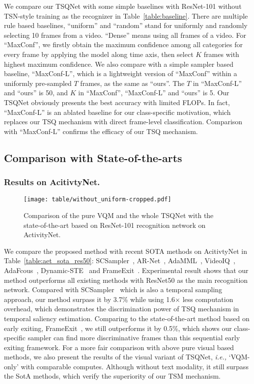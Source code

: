\documentclass[runningheads]{llncs}
\newcommand{\tabref}[1]{Table~\ref{#1}}
\begin{document}
We compare our TSQNet with some simple baselines with ResNet-101 without TSN-style training as the recognizer in \tabref{table:baseline}. There are multiple rule based baselines, ``uniform'' and ``random'' stand for uniformly and randomly selecting 10 frames from a video. ``Dense'' means using all frames of a video. For ``MaxConf'', we firstly obtain the maximum confidence among all categories for every frame by applying the model along time axis, then select $K$ frames with highest maximum confidence. We also compare with a simple sampler based baseline, ``MaxConf-L'', which is a lightweight version of ``MaxConf'' within a uniformly pre-sampled $T$ frames, as the same as ``ours''. The $T$ in ``MaxConf-L'' and ``ours'' is 50, and $K$ in ``MaxConf'', ``MaxConf-L'' and ``ours'' is 5.
 Our TSQNet obviously presents the best accuracy with limited FLOPs. In fact, ``MaxConf-L'' is an ablated baseline for our class-specific motivation, which replaces our TSQ mechanism with direct frame-level classification. Comparison with ``MaxConf-L'' confirms the efficacy of our TSQ mechanism.


\subsection{Comparison with State-of-the-arts}
\label{exp:sota}

\subsubsection{Results on AcitivtyNet.}
\begin{wrapfigure}{r}{0.5\textwidth} \centering \texttt{[image: table/without\_uniform-cropped.pdf]} \caption{Comparison of the pure VQM and the whole TSQNet with the state-of-the-art based on ResNet-101 recognition network on ActivityNet.} \label{Fig.anet_res101} \end{wrapfigure}
We compare the proposed method with recent SOTA methods on AcitivtyNet in \tabref{table:aet_sota_res50}: SCSampler~\cite{scsampler19}, AR-Net~\cite{arnet}, AdaMML~\cite{adamml}, VideoIQ~\cite{videoiq}, AdaFcous~\cite{adafocus}, Dynamic-STE~\cite{dynamicSTE} and FrameExit~\cite{frameexit}.
Experimental result shows that our method 
outperforms all existing methods with ResNet50 as the main recognition network. 
Compared with SCSampler~\cite{scsampler19} which is also a temporal sampling approach, our method surpass it by 3.7\% while using 1.6$\times$ less computation overhead, which demonstrates the discrimination power of TSQ mechanism in temporal saliency estimation.
Comparing to the state-of-the-art method based on early exiting, FrameExit~\cite{frameexit}, we still outperforms it by 0.5\%, which shows our class-specific sampler can find more discriminative frames than this sequential early exiting framework. For a more fair comparison with above pure visual based methods, we also present the results of the visual variant of TSQNet, \emph{i.e.,} `VQM-only' with comparable computes. Although without text modality, it still surpass the SotA methods, which verify the superiority of our TSM mechanism.
\end{document}
